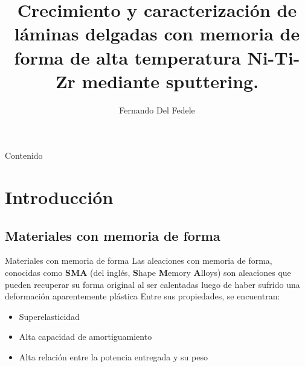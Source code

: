 \documentclass[11pt]{beamer}
\author{Fernando Del Fedele}
\title{Crecimiento y caracterización de
láminas delgadas con memoria de
forma de alta temperatura Ni-Ti-Zr
mediante sputtering.}
\begin{document}
\begin{frame}
\titlepage
\end{frame}

\begin{frame}[allowframebreaks]{Contenido}
\tableofcontents
\end{frame}

\section{Introducción}

	\subsection{Materiales con memoria de forma}
		\begin{frame}{Materiales con memoria de forma}
			Las aleaciones con memoria de forma, conocidas como \textbf{SMA} (del inglés, \textbf{S}hape \textbf{M}emory \textbf{A}lloys) son aleaciones que pueden recuperar su forma original al ser calentadas luego de haber sufrido una deformación aparentemente plástica
			Entre sus propiedades, se encuentran:
			\begin{itemize}
				\item Superelasticidad
				\item Alta capacidad de amortiguamiento
				\item Alta relación entre la potencia entregada y su peso
			\end{itemize}
		\end{frame}
			
\end{document}
